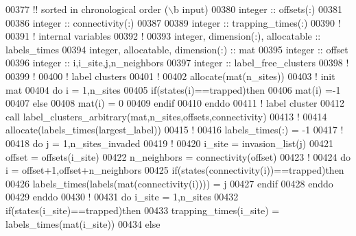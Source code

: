\begin{DoxyCode}
00377     \textcolor{comment}{!! sorted in chronological order (\(\backslash\)b input)}
00380     \textcolor{keywordtype}{integer} :: offsets(:)
00381 
00386     \textcolor{keywordtype}{integer} :: connectivity(:)
00387 
00389     \textcolor{keywordtype}{integer} :: trapping\_times(:)
00390     \textcolor{comment}{!}
00391     \textcolor{comment}{! internal variables}
00392     \textcolor{comment}{! }
00393     \textcolor{keywordtype}{integer}, \textcolor{keywordtype}{dimension(:)}, \textcolor{keywordtype}{allocatable} :: labels\_times
00394     \textcolor{keywordtype}{integer}, \textcolor{keywordtype}{allocatable}, \textcolor{keywordtype}{dimension(:)} :: mat
00395     \textcolor{keywordtype}{integer} :: offset
00396     \textcolor{keywordtype}{integer} :: i,i\_site,j,n\_neighbors
00397     \textcolor{keywordtype}{integer} :: label\_free\_clusters
00398     \textcolor{comment}{!}
00399     \textcolor{comment}{!}
00400     \textcolor{comment}{! label clusters }
00401     \textcolor{comment}{!}
00402     \textcolor{keyword}{allocate}(mat(n\_sites))
00403     \textcolor{comment}{! init mat}
00404     \textcolor{keyword}{do} i = 1,n\_sites
00405        \textcolor{keyword}{if}(states(i)==trapped)\textcolor{keyword}{then}
00406           mat(i) =-1
00407        \textcolor{keyword}{else}
00408           mat(i) = 0
00409        \textcolor{keyword}{endif}
00410     \textcolor{keyword}{enddo}
00411     \textcolor{comment}{! label cluster}
00412     call label\_clusters\_arbitrary(mat,n\_sites,offsets,connectivity)
00413     \textcolor{comment}{!}
00414     \textcolor{keyword}{allocate}(labels\_times(largest\_label))
00415     \textcolor{comment}{!}
00416     labels\_times(:) = -1
00417     \textcolor{comment}{!}
00418     \textcolor{keyword}{do} j = 1,n\_sites\_invaded
00419        \textcolor{comment}{!}
00420        i\_site = invasion\_list(j) 
00421        offset = offsets(i\_site)
00422        n\_neighbors = connectivity(offset)
00423        \textcolor{comment}{!}
00424        \textcolor{keyword}{do} i = offset+1,offset+n\_neighbors 
00425           \textcolor{keyword}{if}(states(connectivity(i))==trapped)\textcolor{keyword}{then}
00426              labels\_times(labels(mat(connectivity(i)))) = j
00427           \textcolor{keyword}{endif}
00428        \textcolor{keyword}{enddo}
00429     \textcolor{keyword}{enddo}
00430     \textcolor{comment}{!}
00431     \textcolor{keyword}{do} i\_site = 1,n\_sites
00432        \textcolor{keyword}{if}(states(i\_site)==trapped)\textcolor{keyword}{then}
00433           trapping\_times(i\_site) = labels\_times(mat(i\_site))
00434        \textcolor{keyword}{else}

\end{DoxyCode}
